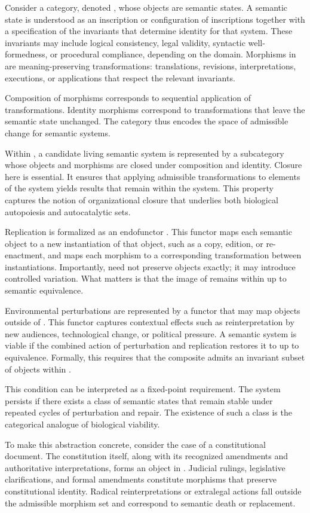 \documentclass[11pt,oneside]{article}
\begin{document}
Consider a category, denoted , whose objects are semantic states. A semantic state is understood as an inscription or configuration of inscriptions together with a specification of the invariants that determine identity for that system. These invariants may include logical consistency, legal validity, syntactic well-formedness, or procedural compliance, depending on the domain. Morphisms in are meaning-preserving transformations: translations, revisions, interpretations, executions, or applications that respect the relevant invariants.

Composition of morphisms corresponds to sequential application of transformations. Identity morphisms correspond to transformations that leave the semantic state unchanged. The category thus encodes the space of admissible change for semantic systems.

Within , a candidate living semantic system is represented by a subcategory whose objects and morphisms are closed under composition and identity. Closure here is essential. It ensures that applying admissible transformations to elements of the system yields results that remain within the system. This property captures the notion of organizational closure that underlies both biological autopoiesis and autocatalytic sets.

Replication is formalized as an endofunctor . This functor maps each semantic object to a new instantiation of that object, such as a copy, edition, or re-enactment, and maps each morphism to a corresponding transformation between instantiations. Importantly, need not preserve objects exactly; it may introduce controlled variation. What matters is that the image of remains within up to semantic equivalence.

Environmental perturbations are represented by a functor that may map objects outside of . This functor captures contextual effects such as reinterpretation by new audiences, technological change, or political pressure. A semantic system is viable if the combined action of perturbation and replication restores it to up to equivalence. Formally, this requires that the composite admits an invariant subset of objects within .

This condition can be interpreted as a fixed-point requirement. The system persists if there exists a class of semantic states that remain stable under repeated cycles of perturbation and repair. The existence of such a class is the categorical analogue of biological viability.

To make this abstraction concrete, consider the case of a constitutional document. The constitution itself, along with its recognized amendments and authoritative interpretations, forms an object in . Judicial rulings, legislative clarifications, and formal amendments constitute morphisms that preserve constitutional identity. Radical reinterpretations or extralegal actions fall outside the admissible morphism set and correspond to semantic death or replacement.
\end{document}
